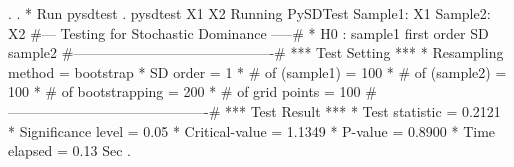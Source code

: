 . 
. * Run pysdtest 
. pysdtest X1 X2
Running PySDTest
Sample1: X1
Sample2: X2
{\smallskip}
\#--- Testing for Stochastic Dominance  -----\#
{\smallskip}
* H0 : sample1 first order SD sample2
{\smallskip}
\#-------------------------------------------\#
{\smallskip}
*** Test Setting ***
* Resampling method      = bootstrap
* SD order               =      1
* \# of (sample1)         =    100 
* \# of (sample2)         =    100
* \# of bootstrapping     =    200
* \# of grid points       =    100
{\smallskip}
\#-------------------------------------------\#
{\smallskip}
*** Test Result ***
* Test statistic         = 0.2121
* Significance level     =  0.05
* Critical-value         = 1.1349
* P-value                = 0.8900
* Time elapsed           =  0.13 Sec
{\smallskip}
. 
